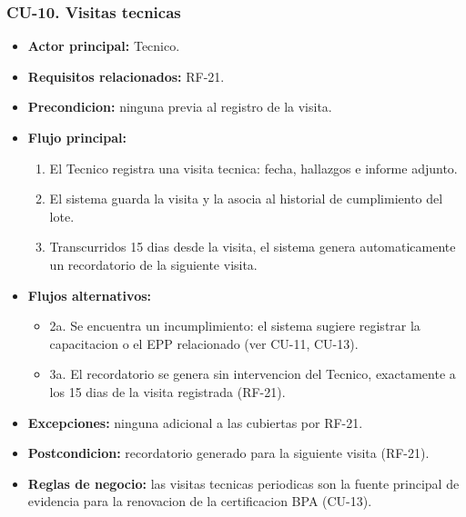 \documentclass[11pt,a4paper]{article}
\begin{document}
\subsubsection{CU-10. Visitas tecnicas}
\begin{itemize}
\item \textbf{Actor principal:} Tecnico.
\item \textbf{Requisitos relacionados:} RF-21.
\item \textbf{Precondicion:} ninguna previa al registro de la visita.
\item \textbf{Flujo principal:}
  \begin{enumerate}
  \item El Tecnico registra una visita tecnica: fecha, hallazgos e informe adjunto.
  \item El sistema guarda la visita y la asocia al historial de cumplimiento del lote.
  \item Transcurridos 15 dias desde la visita, el sistema genera automaticamente un recordatorio de la siguiente visita.
  \end{enumerate}
\item \textbf{Flujos alternativos:}
  \begin{itemize}
  \item 2a. Se encuentra un incumplimiento: el sistema sugiere registrar la capacitacion o el EPP relacionado (ver CU-11, CU-13).
  \item 3a. El recordatorio se genera sin intervencion del Tecnico, exactamente a los 15 dias de la visita registrada (RF-21).
  \end{itemize}
\item \textbf{Excepciones:} ninguna adicional a las cubiertas por RF-21.
\item \textbf{Postcondicion:} recordatorio generado para la siguiente visita (RF-21).
\item \textbf{Reglas de negocio:} las visitas tecnicas periodicas son la fuente principal de evidencia para la renovacion de la certificacion BPA (CU-13).
\end{itemize}
\end{document}
